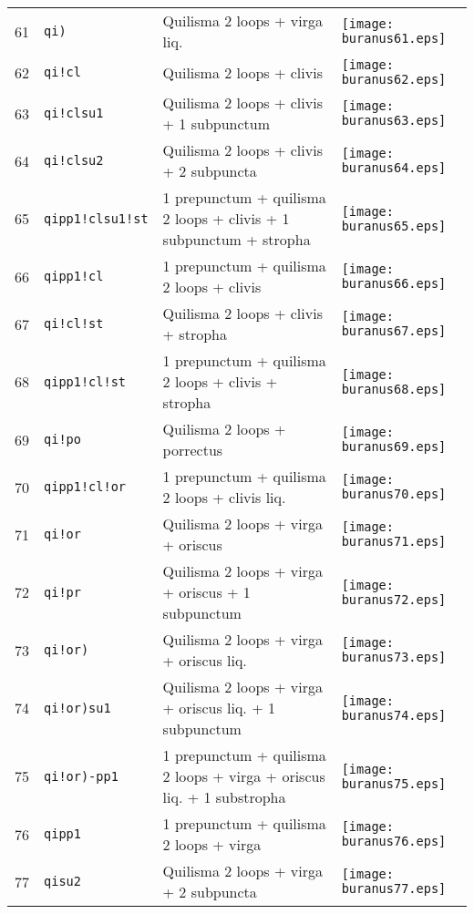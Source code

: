 \documentclass{scrarticle}
\begin{document}
\begin{longtable}{l|l|l|l}
61 & \texttt{qi)} & Quilisma 2 loops + virga liq. & \texttt{[image: buranus61.eps]} \\
62 & \texttt{qi!cl} & Quilisma 2 loops + clivis & \texttt{[image: buranus62.eps]} \\
63 & \texttt{qi!clsu1} & Quilisma 2 loops + clivis + 1 subpunctum & \texttt{[image: buranus63.eps]} \\
64 & \texttt{qi!clsu2} & Quilisma 2 loops + clivis + 2 subpuncta & \texttt{[image: buranus64.eps]} \\
65 & \texttt{qipp1!clsu1!st} & 1 prepunctum + quilisma 2 loops + clivis + 1 subpunctum + stropha & \texttt{[image: buranus65.eps]} \\
66 & \texttt{qipp1!cl} & 1 prepunctum + quilisma 2 loops + clivis & \texttt{[image: buranus66.eps]} \\
67 & \texttt{qi!cl!st} & Quilisma 2 loops + clivis + stropha & \texttt{[image: buranus67.eps]} \\
68 & \texttt{qipp1!cl!st} & 1 prepunctum + quilisma 2 loops + clivis + stropha & \texttt{[image: buranus68.eps]} \\
69 & \texttt{qi!po} & Quilisma 2 loops + porrectus & \texttt{[image: buranus69.eps]} \\
70 & \texttt{qipp1!cl!or} & 1 prepunctum + quilisma 2 loops + clivis liq. & \texttt{[image: buranus70.eps]} \\
71 & \texttt{qi!or} & Quilisma 2 loops + virga + oriscus & \texttt{[image: buranus71.eps]} \\
72 & \texttt{qi!pr} & Quilisma 2 loops + virga + oriscus + 1 subpunctum & \texttt{[image: buranus72.eps]} \\
73 & \texttt{qi!or)} & Quilisma 2 loops + virga + oriscus liq. & \texttt{[image: buranus73.eps]} \\
74 & \texttt{qi!or)su1} & Quilisma 2 loops + virga + oriscus liq. + 1 subpunctum & \texttt{[image: buranus74.eps]} \\
75 & \texttt{qi!or)-pp1} & 1 prepunctum + quilisma 2 loops + virga + oriscus liq. + 1 substropha & \texttt{[image: buranus75.eps]} \\
76 & \texttt{qipp1} & 1 prepunctum + quilisma 2 loops + virga & \texttt{[image: buranus76.eps]} \\
77 & \texttt{qisu2} & Quilisma 2 loops + virga + 2 subpuncta & \texttt{[image: buranus77.eps]} \\

\end{longtable}
\end{document}
